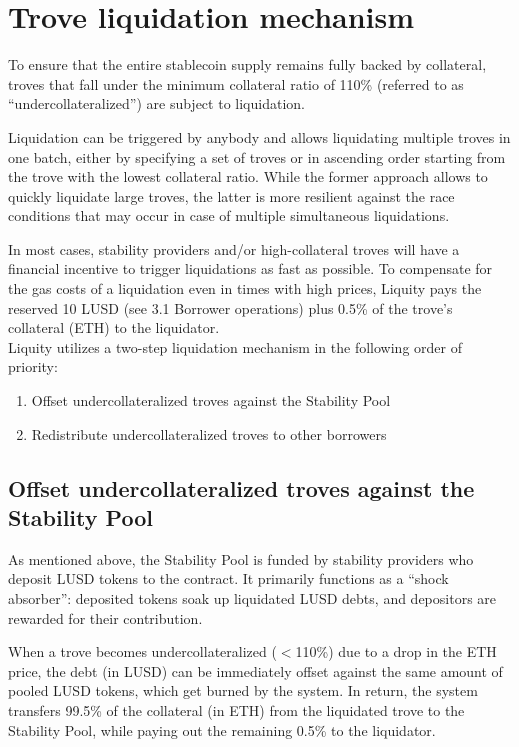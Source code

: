 \documentclass{article}
\begin{document}
\section{Trove liquidation mechanism}
To ensure that the entire stablecoin supply remains fully backed by collateral, troves that fall under the minimum collateral ratio of 110\% (referred to as “undercollateralized”) are subject to liquidation.

Liquidation can be triggered by anybody and allows liquidating multiple troves in one batch, either by specifying a set of troves or in ascending order starting from the trove with the lowest collateral ratio. While the former approach allows to quickly liquidate large troves, the latter is more resilient against the race conditions that may occur in case of multiple simultaneous liquidations.

In most cases, stability providers and/or high-collateral troves will have a financial incentive to trigger liquidations as fast as possible. To compensate for the gas costs of a liquidation even in times with high prices, Liquity pays the reserved 10 LUSD (see 3.1 Borrower operations) plus 0.5\% of the trove’s collateral (ETH) to the liquidator.
\\

Liquity utilizes a two-step liquidation mechanism in the following order of priority:
\begin{enumerate}
    \item Offset undercollateralized troves against the Stability Pool
    \item Redistribute undercollateralized troves to other borrowers
\end{enumerate}

\subsection{Offset undercollateralized troves against the Stability Pool}
As mentioned above, the Stability Pool is funded by stability providers who deposit LUSD tokens to the contract. It primarily functions as a “shock absorber”: deposited tokens soak up liquidated LUSD debts, and depositors are rewarded for their contribution. 

When a trove becomes undercollateralized ($<$110\%) due to a drop in the ETH price, the debt (in LUSD) can be immediately offset against the same amount of pooled LUSD tokens, which get burned by the system. In return, the system transfers 99.5\% of the collateral (in ETH) from the liquidated trove to the Stability Pool, while paying out the remaining 0.5\% to the liquidator.\\
\end{document}
